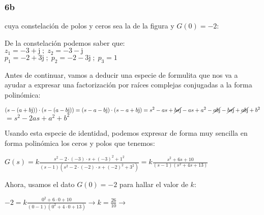 \documentclass[11pt]{article}
\def\imj{\mathrm{j}}
\begin{document}
	
	\subsubsection{6b}
	cuya constelación de polos y ceros sea la de la figura y $G(0)=-2$:
	

	De la constelación podemos saber que:\\
	$z_1=-3+\imj \;;\; z_2=-3-\imj$\\
	$p_1=-2+3\imj \;;\; p_2=-2-3\imj \; ; \; p_3=1$
	
	Antes de continuar, vamos a deducir una especie de formulita que nos va a ayudar a expresar una factorización por raíces complejas conjugadas a la forma polinómica:
	
	$(s-(a+b\imj))\cdot(s-(a-b\imj))=(s-a-b\imj)\cdot(s-a+b\imj)=s^2-as+\cancel{bs\imj}-as+a^2-\cancel{ab\imj}-\cancel{bs\imj}+\cancel{ab\imj}+b^2$\\
	$= \boxed{s^2 -2as +a^2+b^2}$
	
	Usando esta especie de identidad, podemos expresar de forma muy sencilla en forma polinómica los ceros y polos que tenemos:
	
	$\displaystyle G(s)=k\frac{s^2-2\cdot(-3)\cdot s+(-3)^2+1^2}{(s-1)(s^2-2\cdot(-2)\cdot s+(-2)^2+3^2)}=k\frac{s^2+6s+10}{(s-1)(s^2+4s+13)}$
	
	Ahora, usamos el dato $G(0)=-2$ para hallar el valor de $k$:
	
	$\displaystyle -2=k\frac{0^2+6\cdot0+10}{(0-1)(0^2+4\cdot0+13)} \rightarrow k=\frac{26}{10} \rightarrow$ 
	
\end{document}
